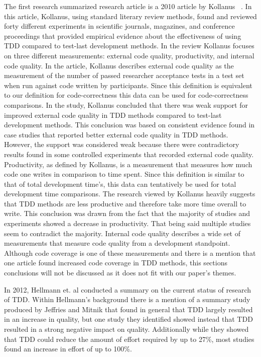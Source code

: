 \documentclass{sig-alternate}
\begin{document}
The first research summarized research article  is a 2010 article by Kollanus ~\cite{Kollanus:2010}.  In this article, Kollanus, using standard literary review methods, found and reviewed forty different experiments in scientific journals, magazines, and conference proceedings that provided empirical evidence about the effectiveness of using TDD compared to test-last development methods.  In the review Kollanus focuses on three different measurements: external code quality, productivity, and internal code quality.  In the article, Kollanus describes external code quality as the measurement of the number of passed researcher acceptance tests in a test set when run against code written by participants.  Since this definition is equivalent to our definition for code-correctness this data can be used for code-correctness comparisons. In the study, Kollanus concluded that there was weak support for improved external code quality in TDD methods compared to test-last development methods.  This conclusion was based on consistent evidence found in case studies that reported better external code quality in TDD methods.  However, the support was considered weak because there were contradictory results found in some controlled experiments that recorded external code quality.  Productivity, as defined by Kollanus, is a measurement that measures how much code one writes in comparison to time spent.  Since this definition is similar to that of total development time's, this data can tentatively be used for total development time comparisons.  The research viewed by Kollanus heavily suggests that TDD methods are less productive and therefore take more time overall to write.  This conclusion was drawn from the fact that the majority of studies and experiments showed a decrease in productivity.  That being said multiple studies seem to contradict the majority.   Internal code quality describes a wide set of measurements that measure code quality from a development standpoint.  Although code coverage is one of these measurements and there is a mention that one article found increased code coverage in TDD methods, this sections conclusions will not be discussed as it does not fit with our paper's themes.

In 2012, Hellmann et. al conducted a summary on the current status of research of TDD.  Within Hellmann's background there is a mention of a summary study produced by Jeffries and Mitnik that found in general that TDD largely resulted in an increase in quality, but one study they identified showed instead that TDD resulted in a strong negative impact on quality.  Additionally while they showed that TDD could reduce the amount of effort required by up to 27\%, most studies found an increase in effort of up to 100\%.
\end{document}
